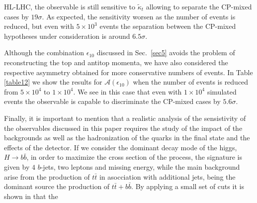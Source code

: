 \documentclass[aps,preprint,tightenlines,floatfix,superscriptaddress,nofootinbib,showpacs]{revtex4-1}
\def\tbar{\bar{t}}
\def\bbar{\bar{b}}
\def\kpt{\tilde{\kappa}_t}
\begin{document}
HL-LHC, the observable is still sensitive to $\kpt$ allowing to
separate the $\mathrm{CP}$-mixed cases by $19\sigma$. As expected, the
sensitivity worsen as the number of events is reduced, but even with
$5\times 10^3$ events the separation between the $\mathrm{CP}$-mixed
hypotheses under consideration is around $6.5\sigma$. \par Although
the combination $\epsilon_{10}$ discussed in Sec.~\ref{sec5} avoids
the problem of reconstructing the top and antitop momenta, we have
also considered the respective asymmetry obtained for more
conservative numbers of events. In Table \ref{table12} we show the
results for $\mathcal{A}(\epsilon_{10})$ when the number of events is
reduced from $5\times 10^4$ to $1\times 10^4$. We see in this case
that even with $1\times 10^4$ simulated events the observable is
capable to discriminate the $\mathrm{CP}$-mixed cases by
$5.6\sigma$.\par Finally, it is important to mention that a realistic
analysis of the sensistivity of the observables discussed in this
paper requires the study of the impact of the backgrounds as well as
the hadronization of the quarks in the final state and the effects of
the detector. If we consider the dominant decay mode of the higgs,
$H\rightarrow b\bbar$, in order to maximize the cross section of the
process, the signature is given by $4$ $b$-jets, two leptons and
missing energy, while the main background arise from the production of
$t\tbar$ in asocciation with additional jets, being the dominant
source the production of $t\tbar + b\bbar$. By applying a small set of
cuts it is shown in \cite{chinos} that the
\end{document}
